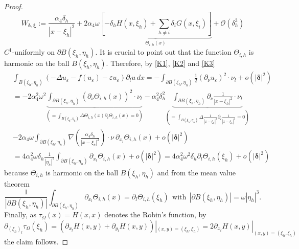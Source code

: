\documentclass[11pt,a4paper]{amsart}
\newcommand{\e}{\varepsilon}
\renewcommand{\d }{\delta }
\theoremstyle{definition}
\renewcommand{\(}{\left(}
\renewcommand{\)}{\right)}
\begin{document}
\begin{proof}
\begin{equation}\label{K3}
W_{\pmb{\d}, \pmb{\xi}} := \frac{\alpha_4 \d_h}{|x-\xi_h|^{2}} + 2\alpha_4 \omega \underbrace{\left[-\d_h H(x, \xi_h) + \sum_{h \neq i} \d_i G(x, \xi_i) \right]}_{\Theta_{i,h}(x)} + \mathcal{O}(\d_h^{3})
\end{equation}
$C^{1}$-uniformly on $\partial B(\xi_h, \eta_h)$. It is crucial to point out that the function $\Theta_{i,h}$ is harmonic on the ball $B(\xi_h, \eta_h)$. Therefore, by \eqref{K1}, \eqref{K2} and \eqref{K3}
\begin{equation*}
\begin{aligned}
& \int_{B(\xi_h, \eta_h)} \left(-\Delta u_\e -f(u_\e)-\e u_\e\right)\partial_l u\, dx = - \int_{\partial B(\xi_h, \eta_h)} \frac{1}{2} (\partial_{\nu} u_{\e})^{2} \cdot \nu_l + o(|\pmb\d|^2) 
\\& = - 2\alpha_4^2 \omega^2 \underbrace{\int_{\partial B(\xi_h, \eta_h)} (\partial_{\nu} \Theta_{i,h}(x))^{2} \cdot \nu_l}_{(=\int_{B(\xi_h, \eta_h)} \Delta \Theta_{i,h}(x) \partial_{l} \Theta_{i,h}(x) = 0)} - \alpha_{4}^{2} \d_h^{2} \underbrace{\int_{\partial B(\xi_h, \eta_h)} \partial_{\nu} \frac{1}{|x-\xi_h|^{2}} \cdot \nu_l}_{(=\int_{B(\xi_h, \eta_h)} \Delta  \frac{1}{|x-\xi_h|^{2}} \partial_{l}  \frac{1}{|x-\xi_h|^{2}} =0)} 
\\& - 2\alpha_4 \omega  \int_{\partial B(\xi_h, \eta_h)} \nabla \left( \frac{\alpha_4 \d_h}{|x-\xi_h|^{2}} \right) \cdot \nu \ \partial_{x_l} \Theta_{i,h}(x) + o(|\pmb\d|^2) 
\\& = 4 \alpha_4^2 \omega \d_h \frac{1}{|\eta_h|^{3}} \int_{\partial B(\xi_h, \eta_h)} \partial_{x_l} \Theta_{i,h}(x) +  o(|\pmb\d|^2) = 4 \alpha^2_4 \omega^2 \d_h \partial_{l}  \Theta_{i,h}(\xi_h) + o(|\pmb\d|^2) 
\end{aligned}
\end{equation*} 
because $\Theta_{i,h}$ is harmonic on the ball $B(\xi_h, \eta_h)$ and from the mean value theorem
\begin{equation*}
\frac{1}{|\partial B(\xi_h, \eta_h)|}  \int_{\partial B(\xi_h, \eta_h)} \partial_{x_l} \Theta_{i,h}(x) = \partial_{l} \Theta_{i,h}(\xi_h) \ \ \mbox{with} \ \ |\partial B(\xi_h, \eta_h)| = \omega |\eta_h|^3.
\end{equation*}
Finally, as $\tau_\Omega(x)=H(x,x)$ denotes the Robin's function, by
\begin{equation*}
\partial_{(\xi_h)_{l}} \tau_\Omega(\xi_h) = (\partial_{x_l} H(x,y) + \partial_{y_l} H(x,y))|_{(x,y)=(\xi_h, \xi_h)} = 2\partial_{x_l} H(x,y)|_{(x,y)=(\xi_h, \xi_h)}
\end{equation*}
the claim follows.
\end{proof} 
\end{document}
